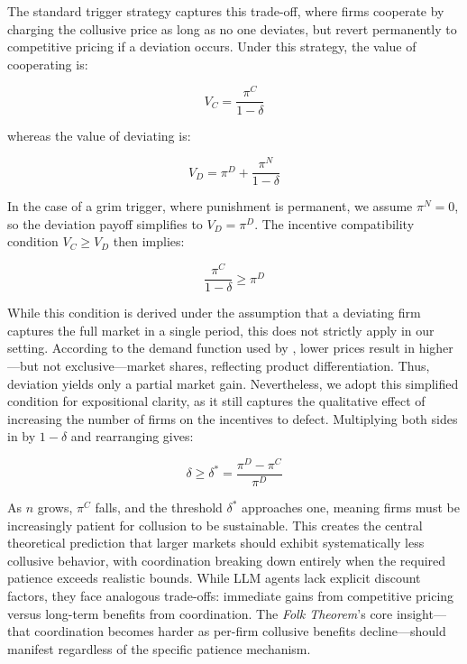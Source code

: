 The standard trigger strategy captures this trade-off, where firms cooperate by charging the collusive price as long as no one deviates, but revert permanently to competitive pricing if a deviation occurs. Under this strategy, the value of cooperating is:

\begin{equation}
    V_C = \frac{\pi^C}{1 - \delta}
\end{equation}

whereas the value of deviating is:

\begin{equation}
    V_D = \pi^D + \frac{\pi^N}{1 - \delta}
\end{equation}

In the case of a grim trigger, where punishment is permanent, we assume $\pi^N = 0$, so the deviation payoff simplifies to $V_D = \pi^D$. The incentive compatibility condition $V_C \geq V_D$ then implies:

\begin{equation}\label{eq:inc}
    \frac{\pi^C}{1 - \delta} \geq \pi^D
\end{equation}

While this condition is derived under the assumption that a deviating firm captures the full market in a single period, this does not strictly apply in our setting. According to the demand function used by \textcite{calvano_artificial_2020}, lower prices result in higher---but not exclusive---market shares, reflecting product differentiation. Thus, deviation yields only a partial market gain. Nevertheless, we adopt this simplified condition for expositional clarity, as it still captures the qualitative effect of increasing the number of firms on the incentives to defect. Multiplying both sides in  by $1 - \delta$ and rearranging gives:

\begin{equation}
    \delta \geq \delta^* = \frac{\pi^D - \pi^C}{\pi^D}
\end{equation}

As $n$ grows, $\pi^C$ falls, and the threshold $\delta^*$ approaches one, meaning firms must be increasingly patient for collusion to be sustainable. This creates the central theoretical prediction that larger markets should exhibit systematically less collusive behavior, with coordination breaking down entirely when the required patience exceeds realistic bounds. While LLM agents lack explicit discount factors, they face analogous trade-offs: immediate gains from competitive pricing versus long-term benefits from coordination. The \emph{Folk Theorem}'s core insight---that coordination becomes harder as per-firm collusive benefits decline---should manifest regardless of the specific patience mechanism.

